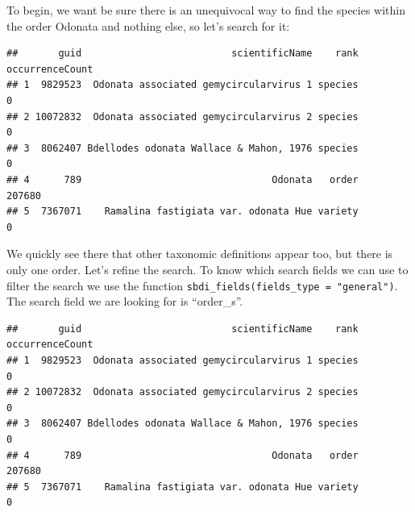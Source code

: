 \documentclass[
  10pt,
]{article}
\newenvironment{Shaded}{\begin{snugshade}}{\end{snugshade}}
\newcommand{\AttributeTok}[1]{\textcolor[rgb]{0.77,0.63,0.00}{#1}}
\newcommand{\DecValTok}[1]{\textcolor[rgb]{0.00,0.00,0.81}{#1}}
\newcommand{\FunctionTok}[1]{\textcolor[rgb]{0.00,0.00,0.00}{#1}}
\newcommand{\NormalTok}[1]{#1}
\newcommand{\OtherTok}[1]{\textcolor[rgb]{0.56,0.35,0.01}{#1}}
\newcommand{\SpecialCharTok}[1]{\textcolor[rgb]{0.00,0.00,0.00}{#1}}
\newcommand{\StringTok}[1]{\textcolor[rgb]{0.31,0.60,0.02}{#1}}
\begin{document}
To begin, we want be sure there is an unequivocal way to find the species within
the order Odonata and nothing else, so let's search for it:

\begin{Shaded}
\end{Shaded}

\begin{verbatim}
##       guid                          scientificName    rank occurrenceCount
## 1  9829523  Odonata associated gemycircularvirus 1 species               0
## 2 10072832  Odonata associated gemycircularvirus 2 species               0
## 3  8062407 Bdellodes odonata Wallace & Mahon, 1976 species               0
## 4      789                                 Odonata   order          207680
## 5  7367071    Ramalina fastigiata var. odonata Hue variety               0
\end{verbatim}

We quickly see there that other taxonomic definitions appear too, but there is only one order.
Let's refine the search. To know which search fields we can use to filter the search
we use the function \texttt{sbdi\_fields(fields\_type\ =\ "general")}.
The search field we are looking for is ``order\_s''.

\begin{Shaded}
\end{Shaded}

\begin{verbatim}
##       guid                          scientificName    rank occurrenceCount
## 1  9829523  Odonata associated gemycircularvirus 1 species               0
## 2 10072832  Odonata associated gemycircularvirus 2 species               0
## 3  8062407 Bdellodes odonata Wallace & Mahon, 1976 species               0
## 4      789                                 Odonata   order          207680
## 5  7367071    Ramalina fastigiata var. odonata Hue variety               0
\end{verbatim}
\end{document}
